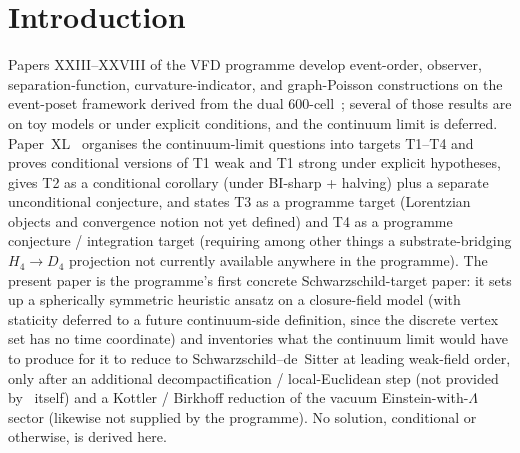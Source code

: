 \documentclass[12pt]{article}
\theoremstyle{definition}
\theoremstyle{remark}
\begin{document}
\section{Introduction}\label{sec:intro}

Papers XXIII--XXVIII of the VFD programme develop event-order, observer, separation-function, curvature-indicator, and graph-Poisson constructions on the event-poset framework derived from the dual 600-cell~\citep{SmartXXIII, SmartXXIV, SmartXXV, SmartXXVI, SmartXXVII, SmartXXVIII}; several of those results are on toy models or under explicit conditions, and the continuum limit is deferred. Paper~XL~\citep{SmartXL} organises the continuum-limit questions into targets T1--T4 and proves conditional versions of T1 weak and T1 strong under explicit hypotheses, gives T2 as a conditional corollary (under BI-sharp + halving) plus a separate unconditional conjecture, and states T3 as a programme target (Lorentzian objects and convergence notion not yet defined) and T4 as a programme conjecture / integration target (requiring among other things a substrate-bridging $H_4 \to D_4$ projection not currently available anywhere in the programme). The present paper is the programme's first concrete Schwarzschild-target paper: it sets up a spherically symmetric heuristic ansatz on a closure-field model (with staticity deferred to a future continuum-side definition, since the discrete vertex set has no time coordinate) and inventories what the continuum limit would have to produce for it to reduce to Schwarzschild--de~Sitter at leading weak-field order, only after an additional decompactification / local-Euclidean step (not provided by~\citep{SmartXL} itself) and a Kottler / Birkhoff reduction of the vacuum Einstein-with-$\Lambda$ sector (likewise not supplied by the programme). No solution, conditional or otherwise, is derived here.
\end{document}
